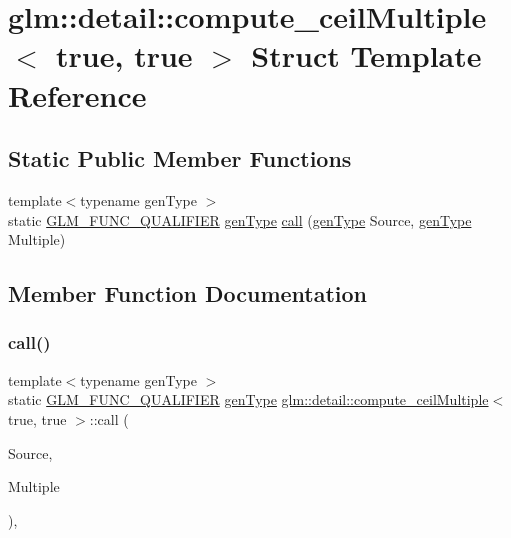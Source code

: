 \hypertarget{structglm_1_1detail_1_1compute__ceil_multiple_3_01true_00_01true_01_4}{}\section{glm\+:\+:detail\+:\+:compute\+\_\+ceil\+Multiple$<$ true, true $>$ Struct Template Reference}
\label{structglm_1_1detail_1_1compute__ceil_multiple_3_01true_00_01true_01_4}
\subsection*{Static Public Member Functions}
\begin{DoxyCompactItemize}
\item 
{\footnotesize template$<$typename gen\+Type $>$ }\\static \hyperlink{setup_8hpp_a33fdea6f91c5f834105f7415e2a64407}{G\+L\+M\+\_\+\+F\+U\+N\+C\+\_\+\+Q\+U\+A\+L\+I\+F\+I\+ER} \hyperlink{structglm_1_1detail_1_1gen_type}{gen\+Type} \hyperlink{structglm_1_1detail_1_1compute__ceil_multiple_3_01true_00_01true_01_4_a6d9103207c947da13d0319d2d4d071d9}{call} (\hyperlink{structglm_1_1detail_1_1gen_type}{gen\+Type} Source, \hyperlink{structglm_1_1detail_1_1gen_type}{gen\+Type} Multiple)
\end{DoxyCompactItemize}


\subsection{Member Function Documentation}
\mbox{\label{structglm_1_1detail_1_1compute__ceil_multiple_3_01true_00_01true_01_4_a6d9103207c947da13d0319d2d4d071d9}} 
\subsubsection{\texorpdfstring{call()}{call()}}
{\footnotesize\ttfamily template$<$typename gen\+Type $>$ \\
static \hyperlink{setup_8hpp_a33fdea6f91c5f834105f7415e2a64407}{G\+L\+M\+\_\+\+F\+U\+N\+C\+\_\+\+Q\+U\+A\+L\+I\+F\+I\+ER} \hyperlink{structglm_1_1detail_1_1gen_type}{gen\+Type} \hyperlink{structglm_1_1detail_1_1compute__ceil_multiple}{glm\+::detail\+::compute\+\_\+ceil\+Multiple}$<$ true, true $>$\+::call (\begin{DoxyParamCaption}\item[{\hyperlink{structglm_1_1detail_1_1gen_type}{gen\+Type}}]{Source,  }\item[{\hyperlink{structglm_1_1detail_1_1gen_type}{gen\+Type}}]{Multiple }\end{DoxyParamCaption})\hspace{0.3cm}{\ttfamily [inline]}, {\ttfamily [static]}}



